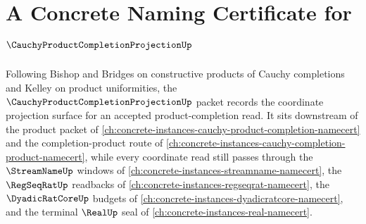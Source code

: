 \chapter{A Concrete Naming Certificate for $\CauchyProductCompletionProjectionUp$}
\label{ch:concrete-instances-cauchy-product-completion-projection-namecert}

Following Bishop and Bridges on constructive products of Cauchy completions and Kelley on product uniformities, the $\CauchyProductCompletionProjectionUp$ packet records the coordinate projection surface for an accepted product-completion read. It sits downstream of the product packet of \autoref{ch:concrete-instances-cauchy-product-completion-namecert} and the completion-product route of \autoref{ch:concrete-instances-cauchy-completion-product-namecert}, while every coordinate read still passes through the $\StreamNameUp$ windows of \autoref{ch:concrete-instances-streamname-namecert}, the $\RegSeqRatUp$ readbacks of \autoref{ch:concrete-instances-regseqrat-namecert}, the $\DyadicRatCoreUp$ budgets of \autoref{ch:concrete-instances-dyadicratcore-namecert}, and the terminal $\RealUp$ seal of \autoref{ch:concrete-instances-real-namecert}.

